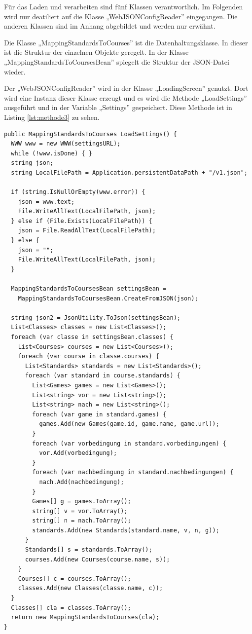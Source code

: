 				Für das Laden und verarbeiten sind fünf Klassen verantwortlich. Im Folgenden wird nur deatiliert auf die Klasse „WebJSONConfigReader” eingegangen. Die anderen Klassen sind im Anhang abgebildet und werden nur erwähnt.

				Die Klasse „MappingStandardsToCourses” ist die Datenhaltungsklasse. In dieser ist die Struktur der einzelnen Objekte geregelt. In der Klasse „MappingStandardsToCoursesBean” spiegelt die Struktur der \ac{JSON}-Datei wieder. 

				Der „WebJSONConfigReader” wird in der Klasse „LoadingScreen” genutzt. Dort wird eine Instanz dieser Klasse erzeugt und es wird die Methode „LoadSettings” ausgeführt und in der Variable „Settings” gespeichert. Diese Methode ist in Listing \ref{lst:methode3} zu sehen.

			\begin{scriptsize}
				\lstset{
					float,
					caption=Methode LoadSettings, 
					language=[Sharp]C, 
					frame=single,  
					showstringspaces=false, 
					showspaces=false, 
					numbers=left, 
					captionpos=b, 
					belowcaptionskip=4pt,
					basicstyle=\ttfamily
				} 
				\begin{lstlisting}[label=lst:methode3]
public MappingStandardsToCourses LoadSettings() {
  WWW www = new WWW(settingsURL);
  while (!www.isDone) { }
  string json;
  string LocalFilePath = Application.persistentDataPath + "/v1.json";
	
  if (string.IsNullOrEmpty(www.error)) {
    json = www.text;
    File.WriteAllText(LocalFilePath, json);
  } else if (File.Exists(LocalFilePath)) {
    json = File.ReadAllText(LocalFilePath);
  } else {
    json = "";                
    File.WriteAllText(LocalFilePath, json);
  }

  MappingStandardsToCoursesBean settingsBean = 
    MappingStandardsToCoursesBean.CreateFromJSON(json);
  
  string json2 = JsonUtility.ToJson(settingsBean);	
  List<Classes> classes = new List<Classes>();
  foreach (var classe in settingsBean.classes) {
    List<Courses> courses = new List<Courses>();
    foreach (var course in classe.courses) {
      List<Standards> standards = new List<Standards>();
      foreach (var standard in course.standards) {
        List<Games> games = new List<Games>();
        List<string> vor = new List<string>();
        List<string> nach = new List<string>();
        foreach (var game in standard.games) {
          games.Add(new Games(game.id, game.name, game.url));
        }
        foreach (var vorbedingung in standard.vorbedingungen) {
          vor.Add(vorbedingung);
        }
        foreach (var nachbedingung in standard.nachbedingungen) {
          nach.Add(nachbedingung);
        }
        Games[] g = games.ToArray();
        string[] v = vor.ToArray();
        string[] n = nach.ToArray();
        standards.Add(new Standards(standard.name, v, n, g));
      }
      Standards[] s = standards.ToArray();
      courses.Add(new Courses(course.name, s));
    }
    Courses[] c = courses.ToArray();
    classes.Add(new Classes(classe.name, c));
  }
  Classes[] cla = classes.ToArray();
  return new MappingStandardsToCourses(cla);
}
				\end{lstlisting}
			\end{scriptsize}

